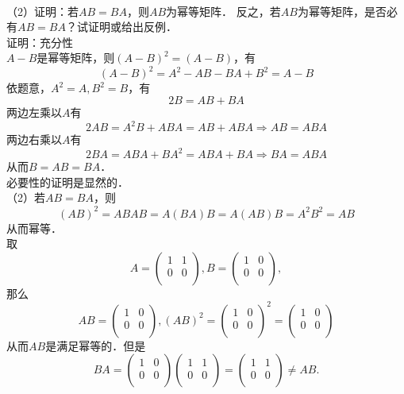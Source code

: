 \documentclass{article}
\begin{document}
\\ （2）证明：若$AB=BA$，则$AB$为幂等矩阵．
反之，若$AB$为幂等矩阵，是否必有$AB=BA$？试证明或给出反例．
\\ 证明：充分性
\\ $A-B$是幂等矩阵，则$(A-B)^2=(A-B)$，有
$$(A-B)^2=A^2-AB-BA+B^2=A-B$$
依题意，$A^2=A,B^2=B$，有
$$2B=AB+BA$$
两边左乘以$A$有
$$2AB=A^2B+ABA=AB+ABA\Rightarrow AB=ABA$$
两边右乘以$A$有
$$2BA=ABA+BA^2=ABA+BA\Rightarrow BA=ABA$$
从而$B=AB=BA$．
\\ 必要性的证明是显然的．
\\ （2）若$AB=BA$，则
$$(AB)^2=ABAB=A(BA)B=A(AB)B=A^2B^2=AB$$
从而幂等．
\\ 取
$$
    A=\left(
    \begin{matrix}
            1 & 1 \\
            0 & 0 \\
        \end{matrix}
    \right),
    B=\left(
    \begin{matrix}
            1 & 0 \\
            0 & 0 \\
        \end{matrix}
    \right),
$$
那么
$$
    AB=\left(
    \begin{matrix}
            1 & 0 \\
            0 & 0 \\
        \end{matrix}
    \right),
    (AB)^2={\left(
    \begin{matrix}
            1 & 0 \\
            0 & 0 \\
        \end{matrix}
    \right)}^2
    =\left(
    \begin{matrix}
            1 & 0 \\
            0 & 0 \\
        \end{matrix}
    \right)
$$
从而$AB$是满足幂等的．但是
$$
    BA=\left(
    \begin{matrix}
            1 & 0 \\
            0 & 0 \\
        \end{matrix}
    \right)
    \left(
    \begin{matrix}
            1 & 1 \\
            0 & 0 \\
        \end{matrix}
    \right)
    =\left(
    \begin{matrix}
            1 & 1 \\
            0 & 0 \\
        \end{matrix}
    \right)
    \neq AB.
$$
\end{document}
